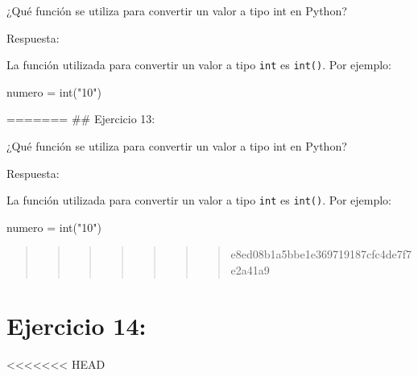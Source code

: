 \documentclass[
  a4paper,
  onepage,
  openany]{scrreprt}
\newenvironment{Shaded}{\begin{snugshade}}{\end{snugshade}}
\newcommand{\BuiltInTok}[1]{\textcolor[rgb]{0.00,0.23,0.31}{#1}}
\newcommand{\NormalTok}[1]{\textcolor[rgb]{0.00,0.23,0.31}{#1}}
\newcommand{\OperatorTok}[1]{\textcolor[rgb]{0.37,0.37,0.37}{#1}}
\newcommand{\StringTok}[1]{\textcolor[rgb]{0.13,0.47,0.30}{#1}}
\begin{document}
¿Qué función se utiliza para convertir un valor a tipo int en Python?

Respuesta:

La función utilizada para convertir un valor a tipo \texttt{int} es
\texttt{int()}. Por ejemplo:

\begin{Shaded}
\begin{Highlighting}[]
\NormalTok{numero }\OperatorTok{=} \BuiltInTok{int}\NormalTok{(}\StringTok{"10"}\NormalTok{)}
\end{Highlighting}
\end{Shaded}

======= \#\# Ejercicio 13:

¿Qué función se utiliza para convertir un valor a tipo int en Python?

Respuesta:

La función utilizada para convertir un valor a tipo \texttt{int} es
\texttt{int()}. Por ejemplo:

\begin{Shaded}
\begin{Highlighting}[]
\NormalTok{numero }\OperatorTok{=} \BuiltInTok{int}\NormalTok{(}\StringTok{"10"}\NormalTok{)}
\end{Highlighting}
\end{Shaded}

\begin{quote}
\begin{quote}
\begin{quote}
\begin{quote}
\begin{quote}
\begin{quote}
\begin{quote}
e8ed08b1a5bbe1e369719187cfc4de7f7e2a41a9
\end{quote}
\end{quote}
\end{quote}
\end{quote}
\end{quote}
\end{quote}
\end{quote}

\hypertarget{ejercicio-14}{%
\chapter{Ejercicio 14:}\label{ejercicio-14}}

\textless\textless\textless\textless\textless\textless\textless{} HEAD
\end{document}
